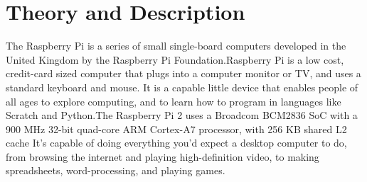 \documentclass[11pt,a4paper]{report}
\begin{document}
	\section{Theory and Description}
	\begin{flushleft}
	The Raspberry Pi is a series of small single-board computers developed in the United Kingdom by the Raspberry Pi Foundation.Raspberry Pi is a low cost, credit-card sized computer that plugs into a computer monitor or TV, and uses a standard keyboard and mouse. It is a capable little device that enables people of all ages to explore computing, and to learn how to program in languages like Scratch and Python.The Raspberry Pi 2 uses a Broadcom BCM2836 SoC with a 900 MHz 32-bit quad-core ARM Cortex-A7 processor, with 256 KB shared L2 cache It’s capable of doing everything you’d expect a desktop computer to do, from browsing the internet and playing high-definition video, to making spreadsheets, word-processing, and playing games.
	\end{flushleft}
\end{document}
